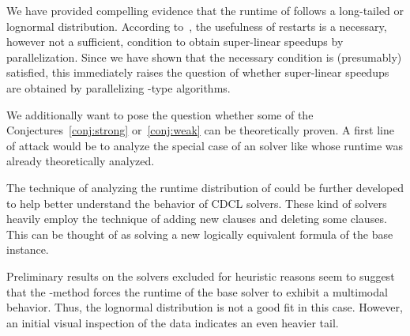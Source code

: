 

We have provided compelling evidence that the runtime of \Alfa{} follows a long-tailed or lognormal distribution.
According to~\cite{SMP11RestartStrategies}, the usefulness of restarts is a necessary, however not 
a sufficient, condition to obtain super-linear speedups by 
parallelization. Since we have shown that the necessary 
condition is (presumably) satisfied, this immediately raises the 
question of whether super-linear speedups are obtained by parallelizing 
\Alfa{}-type algorithms.



We additionally want to pose the question whether some of the Conjectures~\ref{conj:strong} or~\ref{conj:weak} can be theoretically proven.
A first line of attack would be to analyze the special case of an %
solver like \SRWA{} whose runtime was already theoretically analyzed.


The technique of analyzing the runtime distribution of \Alfa{} could be further developed to help better understand the behavior of CDCL solvers.
These kind of solvers heavily employ the technique of adding new clauses and deleting some clauses.
This can be thought of as solving a new logically equivalent formula of the base instance.

Preliminary results on the solvers excluded for heuristic reasons seem to suggest that the \Alfa{}-method forces the runtime of the base solver to exhibit a multimodal behavior. Thus, the lognormal distribution is not a good fit in this case. However, an initial visual inspection of the data indicates an even heavier tail.

